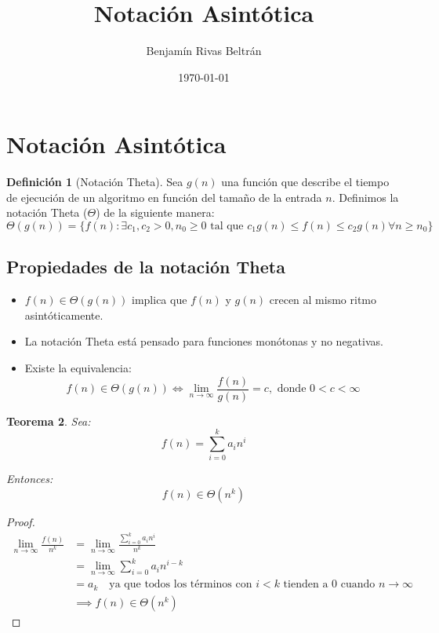 \documentclass{article}
\title{Notación Asintótica}
\author{Benjamín Rivas Beltrán}
\date{\today}
\theoremstyle{definition}
\newtheorem{definition}{Definición}[section]
\theoremstyle{plain}
\newtheorem{theorem}[definition]{Teorema}
\theoremstyle{remark}
\begin{document}
\maketitle

\section{Notación Asintótica}



\begin{definition}[Notación Theta]

Sea $g(n)$ una función que describe el tiempo de ejecución de un algoritmo en función del tamaño de la entrada $n$. Definimos la notación Theta ($\Theta$) de la siguiente manera:
\[
\Theta(g(n)) = \{ f(n) : \exists c_1, c_2 > 0, n_0 \geq 0 \text{ tal que } c_1 g(n) \leq f(n) \leq c_2 g(n) \forall n \geq n_0 \}
\]

\end{definition}

\subsection{Propiedades de la notación Theta}
\begin{itemize}
  \item $f(n) \in \Theta(g(n))$ implica que $f(n)$ y $g(n)$ crecen al mismo ritmo asintóticamente.
  \item La notación Theta está pensado para funciones monótonas y no negativas.
  \item Existe la equivalencia:
  \[
  f(n) \in \Theta(g(n)) \iff \lim_{n \to \infty} \frac{f(n)}{g(n)} = c, \text{ donde } 0 < c < \infty
  \]
\end{itemize}

\begin{theorem}
Sea:
\[
f(n) = \sum_{i=0}^{k} a_i n^i
\]

Entonces:
\[
f(n) \in \Theta(n^k)
\]
\end{theorem}

\begin{proof}
\begin{align*}
  \lim_{n \to \infty} \frac{f(n)}{n^k} &= \lim_{n \to \infty} \frac{\sum_{i=0}^{k} a_i n^i}{n^k} \\
  &= \lim_{n \to \infty} \sum_{i=0}^{k} a_i n^{i-k} \\
  &= a_k \quad \text{ya que todos los términos con $i < k$ tienden a 0 cuando $n \to \infty$} \\
  &\implies f(n) \in \Theta(n^k)
\end{align*}
\end{proof}
\end{document}
